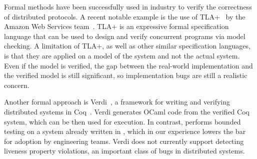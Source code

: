 
Formal methods have been successfully used in industry to verify the correctness of distributed protocols. A recent notable example is the use of TLA+~\cite{lamport1994temporal} by the Amazon Web Services team~\cite{newcombe2015aws}. TLA+ is an expressive formal specification language that can be used to design and verify concurrent programs via model checking. A limitation of TLA+, as well as other similar specification languages, is that they are applied on a model of the system and not the actual system. Even if the model is verified, the gap between the real-world implementation and the verified model is still significant, so implementation bugs are still a realistic concern.

Another formal approach is Verdi~\cite{wilcox2015verdi}, a framework for writing and verifying distributed systems in Coq~\cite{barras1997coq}. Verdi generates OCaml code from the verified Coq system, which can be then used for execution. In contrast, \psharp performs bounded testing on a system already written in \csharp, which in our experience lowers the bar for adoption by engineering teams. Verdi does not currently support detecting liveness property violations, an important class of bugs in distributed systems.
